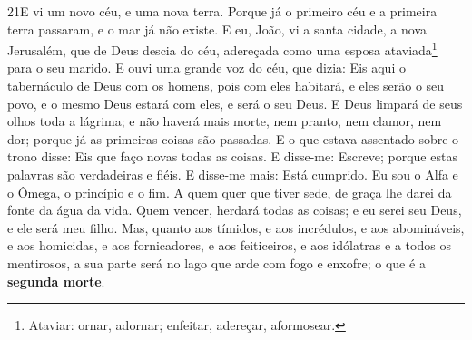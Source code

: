 \lettrine{21} E vi um novo céu, e uma nova terra. Porque já o
primeiro céu e a primeira terra passaram, e o mar já não existe.
E eu, João, vi a santa cidade, a nova Jerusalém, que de Deus
descia do céu, adereçada como uma esposa ataviada\footnote{Ataviar:
ornar, adornar; enfeitar, adereçar, aformosear.} para o seu marido.
E ouvi uma grande voz do céu, que dizia: Eis aqui o tabernáculo
de Deus com os homens, pois com eles habitará, e eles serão o seu
povo, e o mesmo Deus estará com eles, e será o seu Deus. E Deus
limpará de seus olhos toda a lágrima; e não haverá mais morte, nem
pranto, nem clamor, nem dor; porque já as primeiras coisas são
passadas. E o que estava assentado sobre o trono disse: Eis que
faço novas todas as coisas. E disse-me: Escreve; porque estas
palavras são verdadeiras e fiéis. E disse-me mais: Está
cumprido. Eu sou o Alfa e o Ômega, o princípio e o fim. A quem quer
que tiver sede, de graça lhe darei da fonte da água da vida.
Quem vencer, herdará todas as coisas; e eu serei seu Deus, e ele
será meu filho. Mas, quanto aos tímidos, e aos incrédulos, e aos
abomináveis, e aos homicidas, e aos fornicadores, e aos feiticeiros,
e aos idólatras e a todos os mentirosos, a sua parte será no lago
que arde com fogo e enxofre; o que é a \textbf{segunda morte}.

